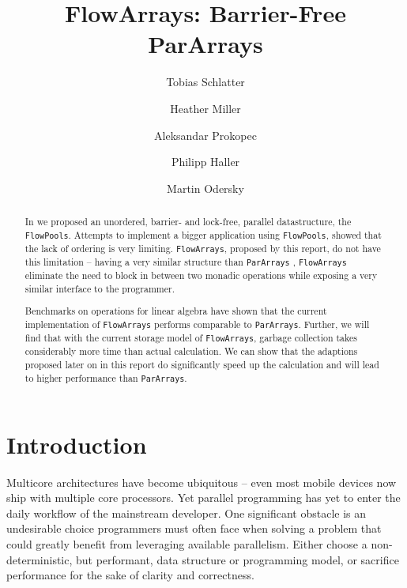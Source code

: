 \documentclass[runningheads,a4paper,fleqn]{llncs}
\begin{document}
\title{FlowArrays: Barrier-Free ParArrays}
\author{Tobias Schlatter \and Heather Miller \and
  Aleksandar Prokopec \and Philipp Haller \and Martin
  Odersky}



\graphicspath{{figs/}}

\newcommand{\plot}[1]{}

\maketitle

\begin{abstract}
  In \cite{FP12} we proposed an unordered, barrier- and lock-free,
  parallel datastructure, the \texttt{FlowPools}. Attempts to implement a
  bigger application using \texttt{FlowPools}, showed that the lack of ordering
  is very limiting. \texttt{FlowArrays}, proposed by this report, do not have
  this limitation -- having a very similar structure than
  \texttt{ParArrays} \cite{collect11}, \texttt{FlowArrays} eliminate the need to block
  in between two monadic operations while exposing a very similar
  interface to the programmer.

  Benchmarks on operations for linear algebra have shown that the
  current implementation of \texttt{FlowArrays} performs comparable to
  \texttt{ParArrays}. Further, we will find that with the current storage model
  of \texttt{FlowArrays}, garbage collection takes considerably more time than
  actual calculation. We can show that
  the adaptions proposed later on in this report do significantly
  speed up the calculation and will lead to higher performance than
  \texttt{ParArrays}.
\end{abstract}

\section{Introduction}
Multicore architectures have become ubiquitous -- even most mobile devices now
ship with multiple core processors. Yet parallel programming has yet to enter
the daily workflow of the mainstream developer. One significant obstacle is an
undesirable choice programmers must often face when solving a problem that
could greatly benefit from leveraging available parallelism. Either choose a
non-deterministic, but performant, data structure or programming model, or
sacrifice performance for the sake of clarity and correctness.
\end{document}
